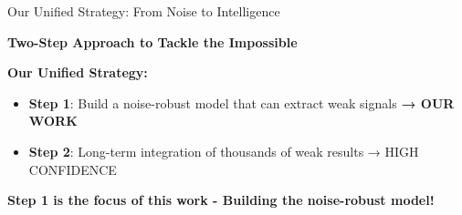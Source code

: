 \documentclass[aspectratio=169]{beamer}
\begin{document}
\begin{frame}{Our Unified Strategy: From Noise to Intelligence}
\begin{center}
\textcolor{zjutblue}{\Large \textbf{Two-Step Approach to Tackle the Impossible}}
\end{center}

\vspace{0.4cm}

\textbf{\textcolor{zjutblue}{Our Unified Strategy:}}
\begin{itemize}
\setlength{\itemsep}{0.2cm}
\item \textbf{\textcolor{zjutred}{Step 1}}: Build a noise-robust model that can extract weak signals \textcolor{zjutred}{\textbf{→ OUR WORK}}
\item \textbf{\textcolor{zjutred}{Step 2}}: Long-term integration of thousands of weak results → HIGH CONFIDENCE
\end{itemize}

\vspace{0.4cm}

\begin{center}
\end{center}

\vspace{0.3cm}

\begin{center}
\textcolor{zjutred}{\large \textbf{Step 1 is the focus of this work - Building the noise-robust model!}}
\end{center}
\end{frame}
\end{document}

